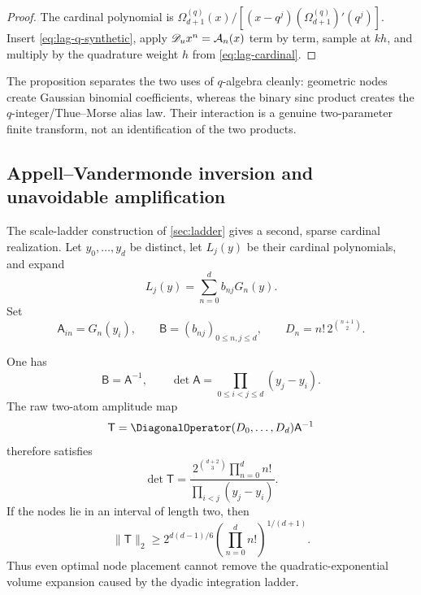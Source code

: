 \begin{proof}
The cardinal polynomial is
$\Omega_{d+1}^{(q)}(x)/
 [(x-q^j)(\Omega_{d+1}^{(q)})'(q^j)]$.  Insert
\eqref{eq:lag-q-synthetic}, apply
$\mathscr D_ux^n=\mathcal A_n(x)$ term by term, sample at $kh$, and multiply by the
quadrature weight $h$ from \eqref{eq:lag-cardinal}.
\end{proof}

The proposition separates the two uses of $q$-algebra cleanly: geometric
nodes create Gaussian binomial coefficients, whereas the binary sinc product
creates the $q$-integer/Thue--Morse alias law.  Their interaction is a genuine
two-parameter finite transform, not an identification of the two products.

\subsection{Appell--Vandermonde inversion and unavoidable amplification}

The scale-ladder construction of \cref{sec:ladder} gives a second, sparse
cardinal realization.  Let $y_0,\ldots,y_d$ be distinct, let
$L_j(y)$ be their cardinal polynomials, and expand
\[
 L_j(y)=\sum_{n=0}^{d}b_{nj}G_n(y).
\]
Set
\begin{equation}
 \mathsf A_{in}=G_n(y_i),\qquad
 \mathsf B=(b_{nj})_{0\le n,j\le d},\qquad
 D_n=n!\,2^{\binom{n+1}{2}}.
 \label{eq:lag-appell-vandermonde-data}
\end{equation}

\begin{theorem}
\label{thm:lag-appell-vandermonde}
One has
\begin{equation}
 \boxed{\mathsf B=\mathsf A^{-1},\qquad
 \det\mathsf A=\prod_{0\le i<j\le d}(y_j-y_i).}
 \label{eq:lag-appell-vandermonde}
\end{equation}
The raw two-atom amplitude map
\[
 \mathsf T=
 \DiagonalOperator(D_0,\ldots,D_d)\mathsf A^{-1}
\]
therefore satisfies
\begin{equation}
 \boxed{\det\mathsf T=
 \frac{2^{\binom{d+2}{3}}\prod_{n=0}^{d}n!}
 {\prod_{i<j}(y_j-y_i)}.}
 \label{eq:lag-amplitude-determinant}
\end{equation}
If the nodes lie in an interval of length two, then
\begin{equation}
 \boxed{\|\mathsf T\|_2\ge
 2^{d(d-1)/6}
 \left(\prod_{n=0}^{d}n!\right)^{1/(d+1)}.}
 \label{eq:lag-node-free-amplification}
\end{equation}
Thus even optimal node placement cannot remove the quadratic-exponential
volume expansion caused by the dyadic integration ladder.
\end{theorem}

